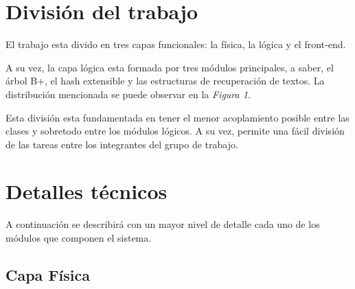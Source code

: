\documentclass{article}
\begin{document}
\section{División del trabajo}

	El trabajo esta divido en tres capas funcionales: la física, la lógica y el front-end.
	\par
	A su vez, la capa lógica esta formada por tres módulos principales, a saber, el árbol B+, el hash extensible y las estructuras de recuperación de textos. La distribución mencionada se puede observar en la \textit{Figura 1}.
	\bigskip\medskip


\bigskip\smallskip


	Esta división esta fundamentada en tener el menor acoplamiento posible entre las clases y sobretodo entre los módulos lógicos. A su vez, permite una fácil división de las tareas entre los integrantes del grupo de trabajo.
	\medskip




\section{Detalles técnicos}

	A continuación se describirá con un mayor nivel de detalle cada uno de los módulos que componen el sistema. \\


\subsection{Capa Física}
	
\end{document}
